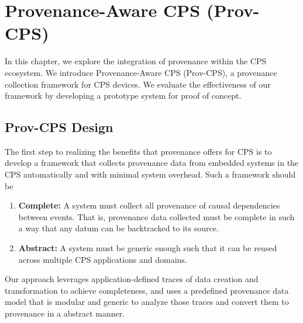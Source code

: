 
\chapter{Provenance-Aware CPS (Prov-CPS)}

In this chapter, we explore the integration of provenance within the CPS ecosystem. We introduce Provenance-Aware CPS (Prov-CPS), a  provenance collection framework for CPS devices. We evaluate the effectiveness of our framework by developing a prototype system for proof of concept.

\section{Prov-CPS Design}\label{sec:design}

The first step to realizing the benefits that provenance offers for CPS is to develop a framework that collects provenance data from embedded systems in the CPS automatically and with minimal system overhead. Such a framework should be

\begin{enumerate}

\item \textbf{Complete:} A system must collect all provenance of causal dependencies between events. That is, provenance data collected must be complete in such a way that any datum can be backtracked to its source. %

\item \textbf{Abstract:} A system must be generic enough such that it can be reused across multiple CPS applications and domains. 

\end{enumerate}

Our approach leverages application-defined traces of data creation and transformation to achieve completeness, and uses a predefined provenance data model that is modular and generic to analyze those traces and convert them to provenance in a abstract manner.



